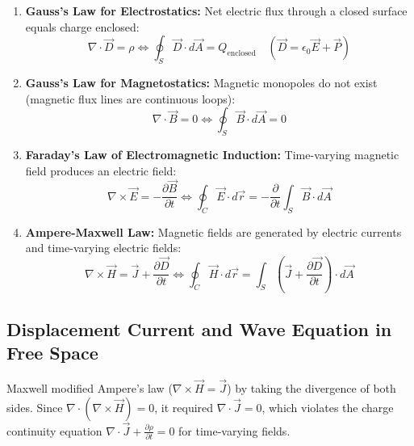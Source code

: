 \documentclass[12pt,a4paper]{article}
\begin{document}
\begin{tcolorbox}[formulabox, title={\textbf{Maxwell's Equations in Differential and Integral Forms}}]
\begin{enumerate}[leftmargin=*, itemsep=4pt]
  \item \textbf{Gauss's Law for Electrostatics:} Net electric flux through a closed surface equals charge enclosed:
  \begin{equation}
  \nabla \cdot \vec{D} = \rho \iff \oint_S \vec{D} \cdot d\vec{A} = Q_{\text{enclosed}} \quad (\vec{D} = \epsilon_0 \vec{E} + \vec{P})
  \end{equation}
  \item \textbf{Gauss's Law for Magnetostatics:} Magnetic monopoles do not exist (magnetic flux lines are continuous loops):
  \begin{equation}
  \nabla \cdot \vec{B} = 0 \iff \oint_S \vec{B} \cdot d\vec{A} = 0
  \end{equation}
  \item \textbf{Faraday's Law of Electromagnetic Induction:} Time-varying magnetic field produces an electric field:
  \begin{equation}
  \nabla \times \vec{E} = -\frac{\partial \vec{B}}{\partial t} \iff \oint_C \vec{E} \cdot d\vec{r} = -\frac{\partial}{\partial t}\int_S \vec{B} \cdot d\vec{A}
  \end{equation}
  \item \textbf{Ampere-Maxwell Law:} Magnetic fields are generated by electric currents and time-varying electric fields:
  \begin{equation}
  \nabla \times \vec{H} = \vec{J} + \frac{\partial \vec{D}}{\partial t} \iff \oint_C \vec{H} \cdot d\vec{r} = \int_S \left(\vec{J} + \frac{\partial \vec{D}}{\partial t}\right) \cdot d\vec{A}
  \end{equation}
\end{enumerate}
\end{tcolorbox}

\subsection{Displacement Current and Wave Equation in Free Space}

Maxwell modified Ampere's law ($\nabla \times \vec{H} = \vec{J}$) by taking the divergence of both sides. Since $\nabla \cdot (\nabla \times \vec{H}) = 0$, it required $\nabla \cdot \vec{J} = 0$, which violates the charge continuity equation $\nabla \cdot \vec{J} + \frac{\partial \rho}{\partial t} = 0$ for time-varying fields.
\end{document}
